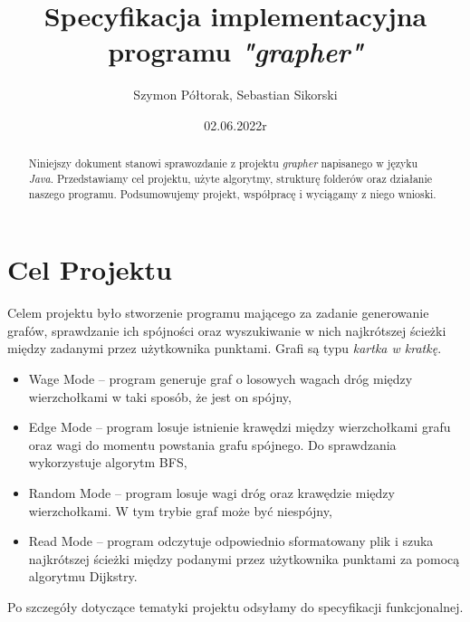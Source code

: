\documentclass[10pt, a4paper]{report}
\title{\huge{\textbf{Specyfikacja implementacyjna} \\ programu \textit{"grapher"}}}
\author{Szymon Półtorak, Sebastian Sikorski}
\date{02.06.2022r}
\begin{document}
\maketitle
\lstset{style=listings}

\begin{abstract}
    Niniejszy dokument stanowi sprawozdanie z projektu \textit{grapher} napisanego w języku \textit{Java}.
     Przedstawiamy cel projektu, użyte algorytmy, strukturę folderów oraz działanie naszego programu. Podsumowujemy projekt, współpracę i wyciągamy z niego wnioski.
\end{abstract}


\renewcommand*\thesection{\arabic{section}} 

\pagestyle{fancy}
\fancyhf{}

\tableofcontents
\newpage

\section{Cel Projektu}
Celem projektu było stworzenie programu mającego za zadanie generowanie grafów, sprawdzanie ich spójności oraz wyszukiwanie w nich najkrótszej ścieżki między zadanymi przez użytkownika punktami. 
Grafi są typu \textit{kartka w kratkę}.
    \begin{itemize}
        \item Wage Mode – program generuje graf o losowych wagach dróg między wierzchołkami w taki sposób, że jest on spójny,
        \item Edge Mode – program losuje istnienie krawędzi między wierzchołkami grafu oraz wagi do momentu powstania 
        grafu spójnego. Do sprawdzania wykorzystuje algorytm BFS,
        \item Random Mode – program losuje wagi dróg oraz krawędzie między wierzchołkami. W tym trybie graf może być niespójny,
        \item Read Mode -- program odczytuje odpowiednio sformatowany plik i szuka najkrótszej ścieżki
        między podanymi przez użytkownika punktami za pomocą algorytmu Dijkstry.
    \end{itemize}
    Po szczegóły dotyczące tematyki projektu odsyłamy do specyfikacji funkcjonalnej.
\end{document}
